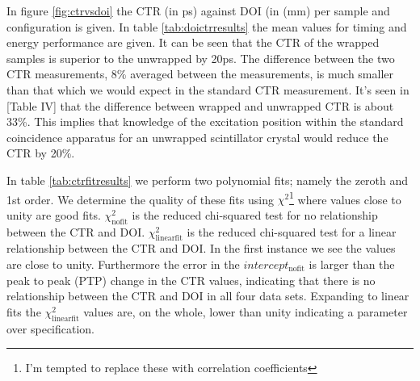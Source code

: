 In figure \ref{fig:ctrvsdoi} the CTR (in ps) against DOI (in (mm) per sample and configuration is given. In table \ref{tab:doictrresults} the mean values for timing and energy performance are given. It can be seen that the CTR of the wrapped samples is superior to the unwrapped by 20ps. The difference between the two CTR measurements, 8\% averaged between the measurements, is much smaller than that which we would expect in the standard CTR measurement. It's seen in [Table IV]\cite{r_Paganoni_Pauwels_et_al__2011} that the difference between wrapped and unwrapped CTR is about 33\%. This implies that knowledge of the excitation position within the standard coincidence apparatus for an unwrapped scintillator crystal would reduce the CTR by 20\%. 

In table \ref{tab:ctrfitresults} we perform two polynomial fits; namely the zeroth and 1st order. We determine the quality of these fits using $\chi^2$\footnote{I'm tempted to replace these with correlation coefficients} where values close to unity are good fits. $\chi^2_\text{nofit}$ is the reduced chi-squared test for no relationship between the CTR and DOI. $\chi^2_\text{linearfit}$ is the reduced chi-squared test for a linear relationship between the CTR and DOI. In the first instance we see the values are close to unity. Furthermore the error in the $intercept_\text{nofit}$ is larger than the peak to peak (PTP) change in the CTR values, indicating that there is no relationship between the CTR and DOI in all four data sets. Expanding to linear fits the $\chi^2_\text{linearfit}$ values are, on the whole, lower than unity indicating a parameter over specification.